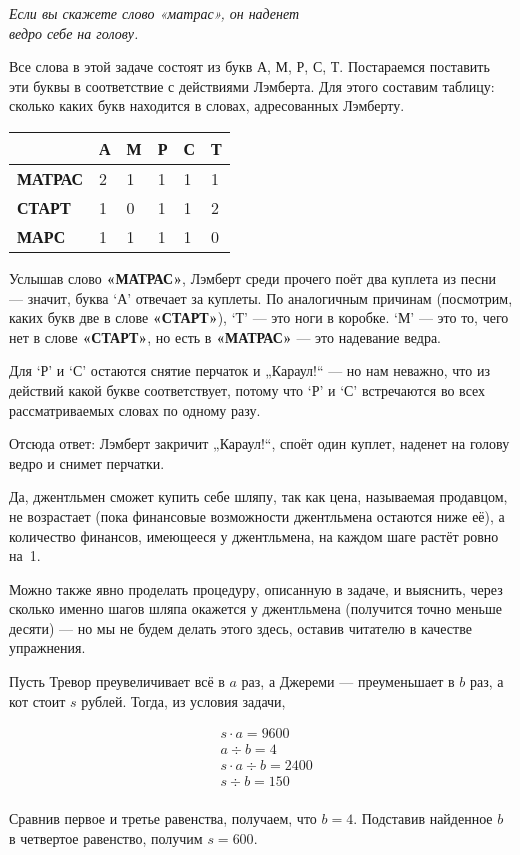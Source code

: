 
\vspace{-0.5cm}
\begin{flushright} \it
Если вы скажете слово «матрас», он наденет \\
ведро себе на голову.
\end{flushright}

\begin{itemize}
\itA Все слова в этой задаче состоят из букв А, М, Р, С, Т. Постараемся поставить эти буквы в соответствие с действиями Лэмберта. Для этого составим таблицу: сколько каких букв находится в словах, адресованных Лэмберту.

\begin{center} \begin{tabular}{|l|l|l|l|l|l|}
\hline		& А & М & Р & С & Т \\ \hline
\bf МАТРАС & 2 & 1 & 1 & 1 & 1 \\ \hline
\bf СТАРТ & 1 & 0 & 1 & 1 & 2 \\ \hline
\bf МАРС & 1 & 1 & 1 & 1 & 0 \\ \hline
\end{tabular} \end{center}

Услышав слово {\bf«МАТРАС»}, Лэмберт среди прочего поёт два куплета из песни — значит, буква `А' отвечает за куплеты. По аналогичным причинам (посмотрим, каких букв две в слове {\bf «СТАРТ»}), `Т' — это ноги в коробке. `М' — это то, чего нет в слове {\bf «СТАРТ»}, но есть в {\bf «МАТРАС»} — это надевание ведра.

Для `Р' и `С' остаются снятие перчаток и „Караул!“ — но нам неважно, что из действий какой букве соответствует, потому что `Р' и `С' встречаются во всех рассматриваемых словах по одному разу.

Отсюда ответ: Лэмберт закричит „Караул!“, споёт один куплет, наденет на голову ведро и снимет перчатки.

\itB Да, джентльмен сможет купить себе шляпу, так как цена, называемая продавцом, не возрастает (пока финансовые возможности джентльмена остаются ниже её), а количество финансов, имеющееся у джентльмена, на каждом шаге растёт ровно на~1.

Можно также явно проделать процедуру, описанную в задаче, и выяснить, через сколько именно шагов шляпа окажется у джентльмена (получится точно меньше десяти) — но мы не будем делать этого здесь, оставив читателю в качестве упражнения.

\itC Пусть Тревор преувеличивает всё в $a$ раз, а Джереми — преуменьшает в $b$ раз, а кот стоит $s$ рублей. Тогда, из условия задачи,

\begin{align*}
	& s \cdot a = 9600 \\
	& a \div b = 4 \\
	& s \cdot a \div b = 2400 \\
	& s \div b = 150 \\
\end{align*}

\vspace{-0.4cm}
Сравнив первое и третье равенства, получаем, что $b=4$. Подставив найденное $b$ в четвертое равенство, получим $s=600$.

\end{itemize}